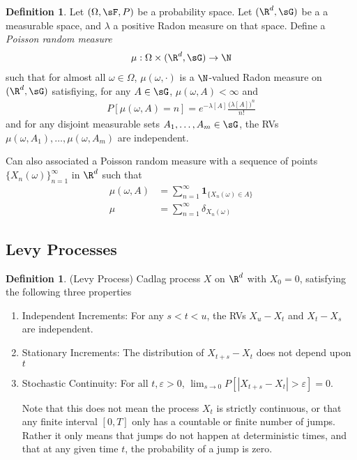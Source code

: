 \documentclass[12pt]{article}
\theoremstyle{plain}
\theoremstyle{definition}
\newtheorem{defn}[thm]{Definition}
\theoremstyle{remark}
\newcommand{\ra}{\rightarrow}
\newcommand{\sumninf}{\sum^\infty_{n=1}}
\newcommand{\ninf}{_{n=1}^\infty}
\begin{document}
\begin{defn}
Let $(\Omega,\sF,P)$ be a probability space.
Let $(\R^d,\sG)$ be a a measurable space, and $\lambda$ a positive Radon
measure on that space.
Define a \emph{Poisson random measure}
\begin{align*}
  \mu:\Omega\times(\R^d,\sG)\ra \N
\end{align*}
such that for almost all $\omega\in\Omega$,
$\mu(\omega,\cdot)$ is a $\N$-valued Radon measure on $(\R^d,\sG)$
satisfiying, for any $A\in\sG$,
$\mu(\omega,A)<\infty$ and
\begin{align*}
  P[\mu(\omega,A)=n]
  =
  e^{-\lambda[A]}
  \frac{\big(\lambda[A]\big)^n}{n!}
\end{align*}
and for any disjoint measurable sets $A_1,\ldots,A_m\in\sG$, the RVs
$\mu(\omega,A_1),\ldots,\mu(\omega,A_m)$ are independent.

Can also associated a Poisson random measure with a sequence of points
$\{X_n(\omega)\}\ninf$ in $\R^d$ such that
\begin{align*}
  \mu(\omega,A)
  &=
  \sumninf \mathbf{1}_{\{X_n(\omega)\in A\}}
  \\
  \mu
  &=
  \sumninf \delta_{X_n(\omega)}
\end{align*}
\end{defn}

\clearpage
\subsection{Levy Processes}

\begin{defn}(Levy Process)
Cadlag process $X$ on $\R^d$ with $X_0=0$, satisfying the following three
properties
\begin{enumerate}[label=(\roman*)]
  \item Independent Increments:
    For any $s<t<u$, the RVs
    $X_u-X_t$ and $X_t-X_s$ are independent.
  \item Stationary Increments:
    The distribution of $X_{t+s}-X_t$ does not depend upon $t$
  \item Stochastic Continuity:
    For all $t,\varepsilon>0$,
    $\lim_{s\ra 0} P[|X_{t+s}-X_t|>\varepsilon]=0$.

    Note that this does not mean the process $X_t$ is strictly
    continuous, or that any finite interval $[0,T]$ only has a countable
    or finite number of jumps.
    Rather it only means that jumps do not happen at deterministic
    times, and that at any given time $t$, the probability of a jump is
    zero.
\end{enumerate}
\end{defn}
\end{document}
